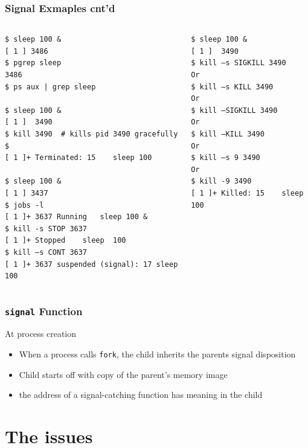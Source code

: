 \documentclass[newPxFont,sthlmFooter,nooffset]{beamer}
\begin{document}
\begin{frame}[fragile,t]
  \frametitle{Signal Exmaples cnt'd}
\begin{columns}[t]
\begin{column}{0.5\linewidth}
{\scriptsize
\begin{verbatim}
$ sleep 100 &
[ 1 ] 3486
$ pgrep sleep
3486
$ ps aux | grep sleep

$ sleep 100 &
[ 1 ]  3490
$ kill 3490  # kills pid 3490 gracefully
$
[ 1 ]+ Terminated: 15    sleep 100

$ sleep 100 &
[ 1 ] 3437
$ jobs -l
[ 1 ]+ 3637 Running   sleep 100 &
$ kill -s STOP 3637
[ 1 ]+ Stopped    sleep  100
$ kill –s CONT 3637
[ 1 ]+ 3637 suspended (signal): 17 sleep 100
\end{verbatim}
}
\end{column}
\begin{column}{0.5\linewidth}
{\scriptsize
\begin{verbatim}
$ sleep 100 &
[ 1 ]  3490
$ kill –s SIGKILL 3490
Or
$ kill –s KILL 3490
Or
$ kill –SIGKILL 3490
Or
$ kill –KILL 3490
Or
$ kill –s 9 3490
Or
$ kill -9 3490
[ 1 ]+ Killed: 15    sleep 100
\end{verbatim}
}
\end{column}
\end{columns}


\end{frame}





\begin{frame}[t]
  \frametitle{\texttt{signal} Function}
At process creation
\begin{itemize}
\item When a process calls \texttt{fork}, the child inherits the parents signal disposition
\item Child starts off with copy of the parent's memory image
\item the address of a signal-catching function has meaning in the child
\end{itemize}
\end{frame}



\section{The issues}
\end{document}
